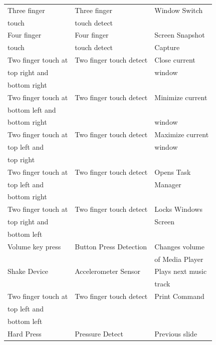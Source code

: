 \documentclass[10pt,conference,letterpaper]{IEEEtran}
\begin{document}
\begin{table}[!h]
\begin{small}
\begin{tabular}{|l|l|l|}
    \hline
    Three finger 	&	Three finger 	& Window Switch     \\
    touch &  touch detect&\\
     \hline
    Four finger 	&	Four finger 	& Screen Snapshot    \\
    touch &  touch detect & Capture\\         
    \hline
    Two finger touch at 		&	Two finger touch detect	&	Close current 		\\
    top right and  &   & window\\
    bottom right &  &\\
    \hline
	 Two finger touch at  &	Two finger touch detect	&	Minimize current 		\\
	 bottom left and  &  &\\
	 bottom right &  &window\\
    \hline
     Two finger touch at 	&	Two finger touch detect	&	Maximize current   \\
     top left and  &    & window \\
     top right &  &\\
     \hline
     Two finger touch at 	&	Two finger touch detect	&	Opens Task   \\
     top left and  &    & Manager \\
     bottom right &  &\\
     \hline
     Two finger touch at 	&	Two finger touch detect	&	Locks Windows   \\
     top right and  &    &  Screen \\
     bottom left &  &\\
     \hline
     Volume key press	&	Button Press Detection	&	Changes volume   \\
      &    &  of Media Player \\
     \hline
     Shake Device	&	Accelerometer Sensor	&	Plays next music  \\
      &    &  track \\
     \hline
     Two finger touch at 		&	Two finger touch detect	&	Print Command 		\\
    top left and  &   & \\
    bottom left &  &\\
    \hline
    Hard Press 		&	Pressure Detect	&	Previous slide 		\\
    \hline
    \end{tabular}
    \end{small} 
\end{table}
\end{document}
